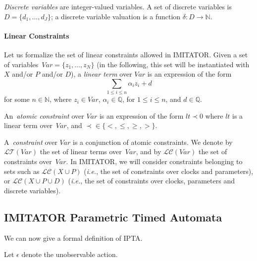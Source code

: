 \documentclass[a4paper,11pt]{report}
\makeatletter
\newcommand{\Clock}{X} %
\newcommand{\dval}{\ensuremath{\delta}} %
\newcommand{\DVar}{D} %
\newcommand{\dvar}{d} %
\newcommand{\DVarCard}{J} %
\newcommand{\LConstraint}{\mathcal{LC}} %
\newcommand{\LConstraintXP}{\LConstraint(\Clock \cup \Param)}
\newcommand{\LConstraintXPD}{\LConstraint(\Clock \cup \Param \cup \DVar)}
\newcommand{\lterm}{\mathit{lt}}
\newcommand{\LTerm}{\mathcal{LT}} %
\newcommand{\Param}{P} %
\newcommand{\unobs}{\ensuremath{\epsilon}}
\newcommand{\Var}{\mathit{Var}} %
\newcommand{\var}{\mathit{z}} %
\newcommand{\VarCard}{N} %
\newcommand{\grandn}{{\mathbb N}}
\newcommand{\grandq}{{\mathbb Q}}
\newcommand{\imitator}{\textsf{IMITATOR}}
\newcommand{\IPTA}{IPTA}
\newcommand{\ie}{\textcolor{colorok}{\textit{i.e.},\@}}
\makeatother
\begin{document}
\emph{Discrete variables} are integer-valued variables.
A set of discrete variables is $\DVar = \{ \dvar_1, \dots, \dvar_\DVarCard \} $;
a discrete variable valuation is a function $\dval \colon \DVar \rightarrow \grandn$.


\paragraph{Linear Constraints}
Let us formalize the set of linear constraints allowed in \imitator{}.
Given a set of variables~$\Var = \{ \var_1, \dots, \var_\VarCard \}$ (in the following, this set will be instantiated with $\Clock$ and/or $\Param$ and/or $\DVar$), a \emph{linear term} over $\Var$ is an expression of the form
$$
\sum_{1 \leq i \leq n} \alpha_i \var_i + d
$$
for some $n \in \grandn$,
	where
	$\var_{i} \in \Var$,
	$\alpha_{i} \in \grandq$, for $1 \leq i \leq n$,
	and
	$d \in \grandq$.

An~\emph{atomic constraint} over $\Var$ is an expression of the form
$
\lterm \prec 0
$
	where
	$\lterm$ is a linear term over~$\Var$,
	and
	$\prec \in \{<, \leq, \geq, >\}$.

A~\emph{constraint} over $\Var$ is a conjunction of atomic constraints.
We denote by $\LTerm(\Var)$ the set of linear terms over~$\Var$, and by $\LConstraint(\Var)$ the set of constraints over~$\Var$.
In \imitator{}, we will consider constraints belonging to sets such as $\LConstraintXP$ (\ie{} the set of constraints over clocks and parameters), or $\LConstraintXPD$ (\ie{} the set of constraints over clocks, parameters and discrete variables).


\subsection{\imitator{} Parametric Timed Automata}


We can now give a formal definition of \IPTA{}.

Let $\unobs$ denote the unobservable action.
\end{document}
